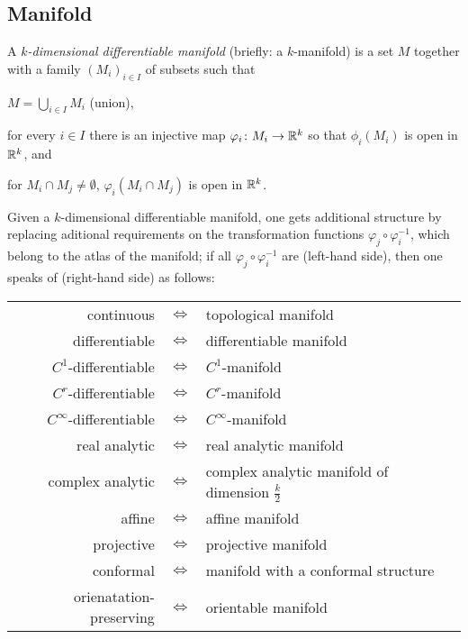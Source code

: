 \documentclass[../main.tex]{subfiles}
\begin{document}
\subsection{Manifold}
\begin{definition}\label{Manifold}
A \textit{\(k\)-dimensional differentiable manifold} (briefly: a \(k\)-manifold)
is a set \(M\) together with a family \(\left(M_i\right)_{i\in I}\) of subsets such that
\begin{APAenumerate}
\item \(M=\bigcup_{i\in I} M_i\) (union),
\item for every \(i\in I\) there is an injective map \(\varphi_i\colon M_i\to\mathbb{R}^k\) so that \(\phi_i\left(M_i\right)\) is open in \(\mathbb{R}^k\), and
\item for \(M_i\cap M_j\ne\emptyset\), \(\varphi_i\left(M_i\cap M_j\right)\) is open in \(\mathbb{R}^k\).
\end{APAenumerate}
\end{definition}
\begin{definition}\label{Manifold:Extended}
Given a \(k\)-dimensional differentiable manifold,
one gets additional structure
by replacing aditional requirements on the transformation functions \(\varphi_j\circ\varphi_i^{-1}\),
which belong to the atlas of the manifold;
if all \(\varphi_j\circ\varphi_i^{-1}\) are (left-hand side),
then one speaks of (right-hand side) as follows:
\begin{center}
\begin{tabular}{ r c l }
continuous&\(\iff\)&topological manifold                                 \\
differentiable&\(\iff\)&differentiable manifold                              \\
\(C^1\)-differentiable&\(\iff\)&\(C^1\)-manifold                                       \\
\(C^r\)-differentiable&\(\iff\)&\(C^r\)-manifold                                       \\
\(C^\infty\)-differentiable&\(\iff\)&\(C^\infty\)-manifold                                  \\
real analytic&\(\iff\)&real analytic manifold                               \\
complex analytic&\(\iff\)&complex analytic manifold of dimension \(\frac{k}{2}\) \\
affine&\(\iff\)&affine manifold                                      \\
projective&\(\iff\)&projective manifold                                  \\
conformal&\(\iff\)&manifold with a conformal structure                  \\
orienatation-preserving&\(\iff\)&orientable manifold                                  \\
\end{tabular}
\end{center}
\end{definition}
\end{document}
